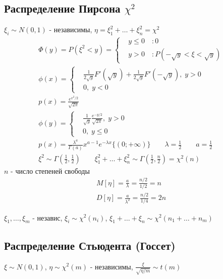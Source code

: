 \documentclass{article}
\begin{document}
\subsection[Распределение Пирсона]{Распределение Пирсона $\chi^2$}
$\xi_i\sim N(0,1)$ - независимы, $\eta=\xi_1^2+\dots+\xi_n^2=\chi^2$
\begin{gather*}
  \Phi(y)=P(\xi^2<y)=\left\{\begin{aligned}
    & y\le0 \quad :0 \\
    & y > 0 \quad :P(-\sqrt{y}<\xi<\sqrt{y})
  \end{aligned}\right. \\
  \phi(x)=   \left\{\begin{aligned}
      & \frac{1}{2\sqrt{y}}F'(\sqrt{y})+\frac{1}{2\sqrt{y}}F'(-\sqrt{y}), \; y> 0 \\
      & 0, \; y<0
    \end{aligned}\right. \\
  p(x)=\frac{e^{x^2/2}}{\sqrt{2\pi}} \\
  \phi(y)=\left\{\begin{aligned}
    & \frac{1}{\sqrt{y}}\frac{e^{-y/2}}{\sqrt{2\pi}}, \; y>0  \\
    & 0, \; y\le 0
  \end{aligned}\right. \\
  p(x)=\frac{\lambda^{a}}{\Gamma(a)}x^{a-1}e^{-\lambda x}\{(0;+\infty)\} \qquad \lambda=\frac{1}{2} \qquad a=\frac{1}{2} \\
  \xi^{2}\sim \Gamma(\frac{1}{2}, \frac{1}{2}) \qquad \xi_1^{2}+\dots+\xi_n^{2} \sim \Gamma(\frac{1}{2}, \frac{n}{2})=\chi^{2}(n)
\end{gather*}
$n$ - число степеней свободы
\begin{gather*}
  M[\eta]=\frac{a}{\lambda}=\frac{n/2}{1/2}=n \\
  D[\eta]=\frac{a}{\lambda^{2}}=\frac{n/2}{1/4}=2n
\end{gather*}

\begin{theorem}
  $\xi_1,\dots,\xi_m$ - независ, $\xi_i\sim \chi^{2}(n_i)$, $\xi_1+\dots+\xi_n\sim \chi^2(n_1+\dots+n_m)$
\end{theorem}

\subsection{Распределение Стьюдента (Госсет)}
$\xi \sim N(0,1)$, $\eta \sim \chi^2(m)$ - независимы, $\frac{\xi}{\sqrt{\eta/m}}\sim t(m)$
\end{document}
